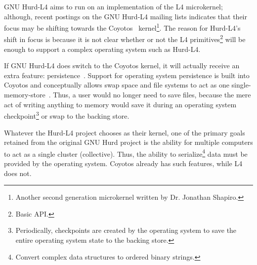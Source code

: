 
GNU Hurd-L4 aims to run on an implementation of the L4 microkernel; although,
recent postings on the GNU Hurd-L4 mailing lists indicates that their
focus may be shifting towards the Coyotos~\cite{l4mailings}
kernel\footnote{Another second generation microkernel written by Dr. Jonathan
Shapiro.}.  The reason for Hurd-L4's shift in focus is because it is not
clear whether or not the L4 primitives\footnote{Basic API.} will be enough
to support a complex operating system such as Hurd-L4.

If GNU Hurd-L4 does switch to the Coyotos kernel, it will actually receive
an extra feature: persistence~\cite{shapiro2002DEO}.  Support for operating
system persistence is built into Coyotos and conceptually allows swap space
and file systems to act as one single-memory-store~\cite{shapiro2002DEO}.
Thus, a user would no longer need to save files, because the mere act of
writing anything to memory would save it during an operating system
checkpoint\footnote{Periodically, checkpoints are created by the operating
system to save the entire operating system state to the backing store.}
or swap to the backing store.

Whatever the Hurd-L4 project chooses as their kernel, one of the primary
goals retained from the original GNU Hurd project is the ability
for multiple computers to act as a single cluster (collective).  Thus,
the ability to serialize\footnote{Convert complex data structures to
ordered binary strings.} data must be provided by the operating system.
Coyotos already has such features, while L4 does not.

